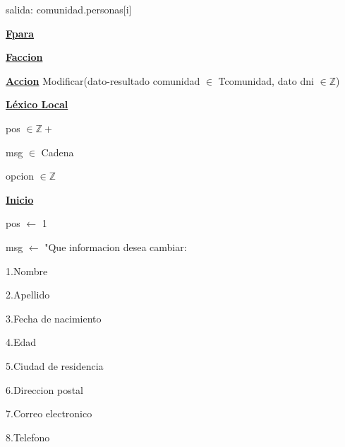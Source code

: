 \documentclass{article}
\begin{document}
                \hspace{16mm}salida: comunidad.personas[i]

            \hspace{12mm}\underline{\textbf{Fpara}}

    \hspace{4mm}\underline{\textbf{Faccion}}

    \vspace{4mm}

    \hspace{4mm}\underline{\textbf{Accion}} Modificar(dato-resultado comunidad $\in$ Tcomunidad, dato dni $\in \mathbb{Z}$)

        \hspace{8mm}\underline{\textbf{Léxico Local}}

            \hspace{12mm}pos $\in \mathbb{Z}+$

            \hspace{12mm}msg $\in$ Cadena

            \hspace{12mm}opcion $\in \mathbb{Z}$

        \hspace{8mm}\underline{\textbf{Inicio}}

            \hspace{12mm}pos $\leftarrow$ 1

            \hspace{12mm}msg $\leftarrow$ "Que informacion desea cambiar: 

                \hspace{25mm}1.Nombre

                \hspace{25mm}2.Apellido

                \hspace{25mm}3.Fecha de nacimiento

                \hspace{25mm}4.Edad

                \hspace{25mm}5.Ciudad de residencia

                \hspace{25mm}6.Direccion postal

                \hspace{25mm}7.Correo electronico

                \hspace{25mm}8.Telefono
\end{document}
